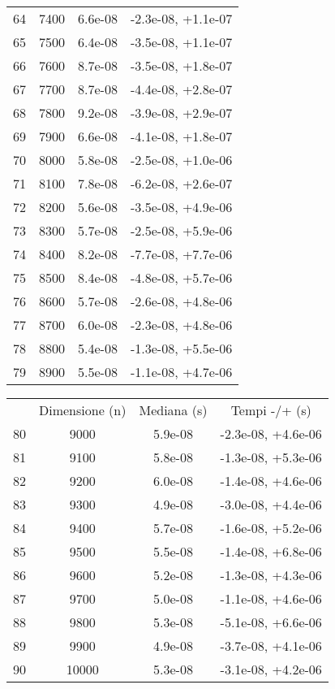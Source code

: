 \begin{table}
\begin{adjustbox}{width=1\textwidth/2}
\begin{tabular}{|c|c|c|c|}
\cline{1-4}
64 & 7400 & 6.6e-08 & -2.3e-08, +1.1e-07 \\
\cline{1-4}
65 & 7500 & 6.4e-08 & -3.5e-08, +1.1e-07 \\
\cline{1-4}
66 & 7600 & 8.7e-08 & -3.5e-08, +1.8e-07 \\
\cline{1-4}
67 & 7700 & 8.7e-08 & -4.4e-08, +2.8e-07 \\
\cline{1-4}
68 & 7800 & 9.2e-08 & -3.9e-08, +2.9e-07 \\
\cline{1-4}
69 & 7900 & 6.6e-08 & -4.1e-08, +1.8e-07 \\
\cline{1-4}
70 & 8000 & 5.8e-08 & -2.5e-08, +1.0e-06 \\
\cline{1-4}
71 & 8100 & 7.8e-08 & -6.2e-08, +2.6e-07 \\
\cline{1-4}
72 & 8200 & 5.6e-08 & -3.5e-08, +4.9e-06 \\
\cline{1-4}
73 & 8300 & 5.7e-08 & -2.5e-08, +5.9e-06 \\
\cline{1-4}
74 & 8400 & 8.2e-08 & -7.7e-08, +7.7e-06 \\
\cline{1-4}
75 & 8500 & 8.4e-08 & -4.8e-08, +5.7e-06 \\
\cline{1-4}
76 & 8600 & 5.7e-08 & -2.6e-08, +4.8e-06 \\
\cline{1-4}
77 & 8700 & 6.0e-08 & -2.3e-08, +4.8e-06 \\
\cline{1-4}
78 & 8800 & 5.4e-08 & -1.3e-08, +5.5e-06 \\
\cline{1-4}
79 & 8900 & 5.5e-08 & -1.1e-08, +4.7e-06 \\
\cline{1-4}
\end{tabular}
\end{adjustbox}
\end{table}

\begin{table}
\centering
\begin{adjustbox}{width=1\textwidth/2}
\begin{tabular}{|c|c|c|c|}
\hline
 & Dimensione (n) & Mediana (s) & Tempi -/+ (s) \\
80 & 9000 & 5.9e-08 & -2.3e-08, +4.6e-06 \\
\cline{1-4}
81 & 9100 & 5.8e-08 & -1.3e-08, +5.3e-06 \\
\cline{1-4}
82 & 9200 & 6.0e-08 & -1.4e-08, +4.6e-06 \\
\cline{1-4}
83 & 9300 & 4.9e-08 & -3.0e-08, +4.4e-06 \\
\cline{1-4}
84 & 9400 & 5.7e-08 & -1.6e-08, +5.2e-06 \\
\cline{1-4}
85 & 9500 & 5.5e-08 & -1.4e-08, +6.8e-06 \\
\cline{1-4}
86 & 9600 & 5.2e-08 & -1.3e-08, +4.3e-06 \\
\cline{1-4}
87 & 9700 & 5.0e-08 & -1.1e-08, +4.6e-06 \\
\cline{1-4}
88 & 9800 & 5.3e-08 & -5.1e-08, +6.6e-06 \\
\cline{1-4}
89 & 9900 & 4.9e-08 & -3.7e-08, +4.1e-06 \\
\cline{1-4}
90 & 10000 & 5.3e-08 & -3.1e-08, +4.2e-06 \\
\cline{1-4}
\end{tabular}
\end{adjustbox}
\end{table}

